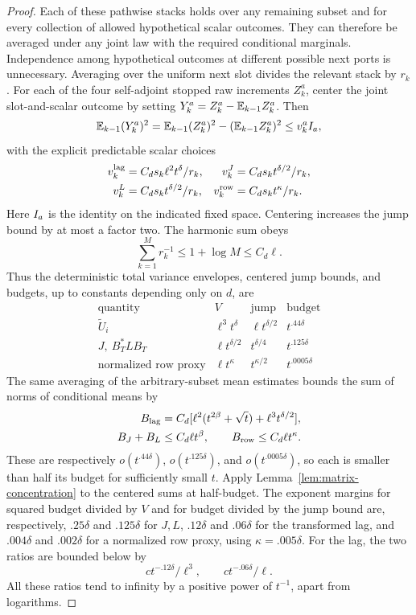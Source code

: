 \begin{proof}
Each of these pathwise stacks holds over any remaining subset and
for every collection of allowed hypothetical scalar outcomes.
They can therefore be averaged under any joint law with the required
conditional marginals.  Independence among hypothetical outcomes at
different possible next ports is unnecessary.  Averaging over the
uniform next slot divides the relevant stack by \(r_k\).
For each of the four self-adjoint stopped raw increments \(Z_k^a\),
center the joint slot-and-scalar outcome by setting
\(Y_k^a=Z_k^a-\mathbb E_{k-1}Z_k^a\).  Then
\[
 \mathbb E_{k-1}(Y_k^a)^2
 =\mathbb E_{k-1}(Z_k^a)^2-(\mathbb E_{k-1}Z_k^a)^2
 \le v_k^aI_a,
\]
with the explicit predictable scalar choices
\[
 \begin{aligned}
 v_k^{\rm lag}&=C_ds_k\ell^2t^\delta/r_k,&
 v_k^J&=C_ds_kt^{\delta/2}/r_k,\\
 v_k^L&=C_ds_kt^{\delta/2}/r_k,&
 v_k^{\rm row}&=C_ds_kt^\kappa/r_k.
 \end{aligned}
\]
Here \(I_a\) is the identity on the indicated fixed space.
Centering increases the jump bound by at most a factor two.  The
harmonic sum obeys
\[
 \sum_{k=1}^M r_k^{-1}\le1+\log M\le C_d\ell.
\]
Thus the deterministic total variance envelopes, centered jump
bounds, and budgets, up to constants depending only on \(d\), are
\[
\begin{array}{c|ccc}
 \text{quantity}&V&\text{jump}&\text{budget}\\\hline
 \widetilde U_i&\ell^3t^\delta&\ell t^{\delta/2}&t^{.44\delta}\\
 J,\ B_T^*LB_T&\ell t^{\delta/2}&t^{\delta/4}&t^{.125\delta}\\
 \text{normalized row proxy}&\ell t^\kappa&t^{\kappa/2}&t^{.0005\delta}
\end{array}
\]
The same averaging of the arbitrary-subset mean estimates bounds the
sum of norms of conditional means by
\[
 \begin{aligned}
 B_{\rm lag}&=C_d[\ell^2(t^{2\beta}+\sqrt t)
                         +\ell^3t^{\delta/2}],\\
 B_J+B_L&\le C_d\ell t^\beta,\qquad
 B_{\rm row}\le C_d\ell t^\kappa.
 \end{aligned}
\]
These are respectively \(o(t^{.44\delta})\), \(o(t^{.125\delta})\),
and \(o(t^{.0005\delta})\), so each is smaller than half its budget
for sufficiently small \(t\).
Apply Lemma~\ref{lem:matrix-concentration} to the centered sums at
half-budget.  The exponent margins for squared budget divided by \(V\) and for
budget divided by the jump bound are, respectively, \(.25\delta\) and
\(.125\delta\) for \(J,L\), \(.12\delta\) and \(.06\delta\) for
the transformed lag, and \(.004\delta\) and \(.002\delta\) for a
normalized row proxy, using \(\kappa=.005\delta\).  For the lag, the
two ratios are bounded below by
\[
 ct^{-.12\delta}/\ell^3,\qquad ct^{-.06\delta}/\ell.
\]
All these ratios tend to infinity by a positive power of \(t^{-1}\),
apart from logarithms.


\end{proof}
